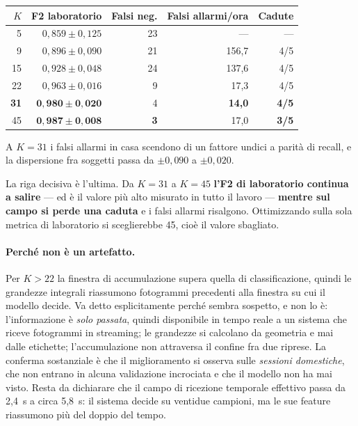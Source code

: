 \begin{center}
\begin{tabular}{rrrrr}
\toprule
$K$ & F2 laboratorio & Falsi neg. & Falsi allarmi/ora & Cadute \\
\midrule
5 & $0{,}859 \pm 0{,}125$ & 23 & --- & --- \\
9 & $0{,}896 \pm 0{,}090$ & 21 & 156,7 & 4/5 \\
15 & $0{,}928 \pm 0{,}048$ & 24 & 137,6 & 4/5 \\
22 & $0{,}963 \pm 0{,}016$ & 9 & 17,3 & 4/5 \\
\textbf{31} & $\mathbf{0{,}980 \pm 0{,}020}$ & 4 & \textbf{14,0} & \textbf{4/5} \\
45 & $\mathbf{0{,}987 \pm 0{,}008}$ & \textbf{3} & 17,0 & \textbf{3/5} \\
\bottomrule
\end{tabular}
\end{center}

A $K = 31$ i falsi allarmi in casa scendono di un fattore undici a parità di recall, e la dispersione fra soggetti passa da $\pm 0{,}090$ a $\pm 0{,}020$.

La riga decisiva è l'ultima. Da $K = 31$ a $K = 45$ \textbf{l'F2 di laboratorio continua a salire} --- ed è il valore più alto misurato in tutto il lavoro --- \textbf{mentre sul campo si perde una caduta} e i falsi allarmi risalgono. Ottimizzando sulla sola metrica di laboratorio si sceglierebbe 45, cioè il valore sbagliato.

\paragraph{Perché non è un artefatto.} Per $K > 22$ la finestra di accumulazione supera quella di classificazione, quindi le grandezze integrali riassumono fotogrammi precedenti alla finestra su cui il modello decide. Va detto esplicitamente perché sembra sospetto, e non lo è: l'informazione è \emph{solo passata}, quindi disponibile in tempo reale a un sistema che riceve fotogrammi in streaming; le grandezze si calcolano da geometria e mai dalle etichette; l'accumulazione non attraversa il confine fra due riprese. La conferma sostanziale è che il miglioramento si osserva sulle \emph{sessioni domestiche}, che non entrano in alcuna validazione incrociata e che il modello non ha mai visto. Resta da dichiarare che il campo di ricezione temporale effettivo passa da 2,4~s a circa 5,8~s: il sistema decide su ventidue campioni, ma le sue feature riassumono più del doppio del tempo.

